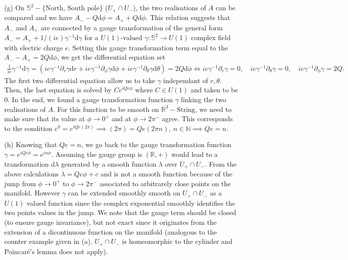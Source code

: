 \documentclass[10pt, a4paper]{article}
\begin{document}
{\begin{enumerate}
  \item[(g)] On $\mathbb{S}^2-\{\text{North, South pole}\}$ ($U_{+} \cap U_{-}$), the two realisations of $A$ can be compared and we have $A_- - Q\text{d}\phi = A_+ + Q\text{d}\phi$. This relation suggests that $A_-$ and $A_+$ are connected by a gauge transformation of the general form $A_- = A_+ + 1/(ie) \gamma^{-1} \text{d}\gamma$ for a $U(1)$-valued $\gamma : \mathbb{S}^2 \to U(1)$ complex field with electric charge $e$. Setting this gauge transformation term equal to the $A_--A_+ = 2Q\text{d}\phi$, we get the differential equation set 
  \begin{align*}
    \frac{1}{ie}\gamma^{-1} \text{d}\gamma = (ie\gamma^{-1}\partial_r \gamma \text{d}r + ie\gamma^{-1}\partial_\phi \gamma \text{d}\phi + ie\gamma^{-1}\partial_\theta \gamma \text{d}\theta)  = 2 Q \text{d}\phi \iff ie\gamma^{-1}\partial_r \gamma = 0, \quad ie\gamma^{-1}\partial_\theta \gamma = 0, \quad ie\gamma^{-1}\partial_\phi \gamma = 2Q. 
  \end{align*}
  The first two differential equation allow us to take $\gamma$ independant of $r, \theta$. Then, the last equation is solved by $C e^{i Qe\phi}$ where $C\in U(1)$ and taken to be $0$. In the end, we found a gauge transformation function $\gamma$ linking the two realisations of $A$. For this function to be smooth on $\mathbb{R}^3-\text{String}$, we need to make sure that its value at $\phi \to 0^+$ and at $\phi \to 2\pi^-$ agree. This corresponds to the condition $e^{0} = e^{i Qe(2\pi)}\implies (2\pi) = Qe (2\pi n),\ n \in \mathbb{N} \implies Qe = n$.  

  \item[(h)] Knowing that $Qe = n$, we go back to the gauge transformation function $\gamma = e^{i Qe \phi} =  e^{i n \phi}$. Assuming the gauge group is $(\mathbb{R}, +)$ would lead to a transformation $\text{d}\lambda$ generated by a smooth function $\lambda$ over $U_{+} \cap U_{-}$. From the above calculations $\lambda = Qe\phi + c$ and is not a smooth function because of the jump from $\phi \to 0^+$ to $\phi \to 2\pi^-$ associated to arbitrarely close points on the manifold. However $\gamma$ can be extended smoothly smooth on $U_{+} \cap U_{-}$ as a $U(1)$ valued function since the complex exponential smoothly identifies the two points values in the jump. We note that the gauge term should be closed (to ensure gauge invariance), but not exact since it originates from the extension of a dicontinuous function on the manifold (analogous to the counter example given in (a), $U_{+} \cap U_{-}$ is homeomorphic to the cylinder and Poincaré's lemma does not apply). 
  

\end{enumerate}}
\end{document}
